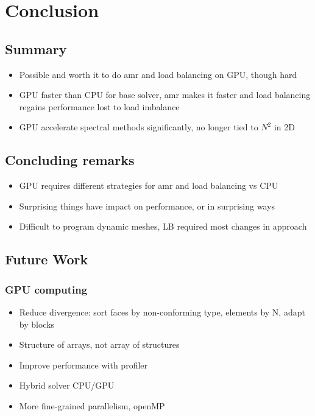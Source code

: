 \chapter{Conclusion}\label{chapter:conclusion}

\section{Summary}\label{section:conclusion:summary}

\begin{itemize}
    \item Possible and worth it to do amr and load balancing on GPU, though hard
    \item GPU faster than CPU for base solver, amr makes it faster and load balancing regains performance lost to load imbalance
    \item GPU accelerate spectral methods significantly, no longer tied to \(N^2\) in 2D
\end{itemize}

\section{Concluding remarks}\label{section:conclusion:remarks}

\begin{itemize}
    \item GPU requires different strategies for amr and load balancing vs CPU
    \item Surprising things have impact on performance, or in surprising ways
    \item Difficult to program dynamic meshes, LB required most changes in approach
\end{itemize}

\section{Future Work}\label{section:conclusion:future_work}

\subsection{GPU computing}\label{subsection:conclusion:future_work:gpu}

\begin{itemize}
    \item Reduce divergence: sort faces by non-conforming type, elements by N, adapt by blocks
    \item Structure of arrays, not array of structures
    \item Improve performance with profiler
    \item Hybrid solver CPU/GPU
    \item More fine-grained parallelism, openMP
\end{itemize}

